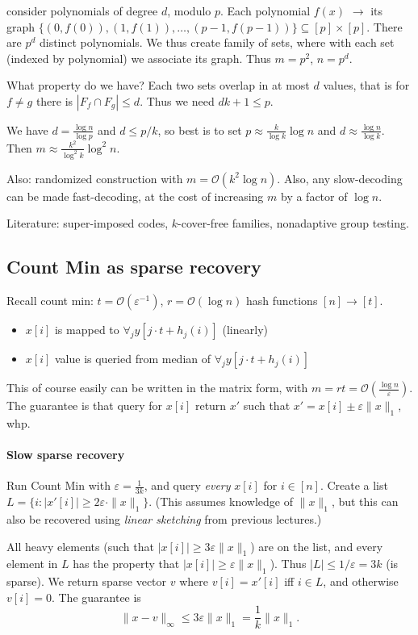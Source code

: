 \documentclass[11pt]{article}
\newcommand{\bigo}{\mathcal{O}}
\begin{document}
{consider polynomials of degree $d$, modulo $p$. Each polynomial $f(x)$ $\to$ its graph $\{(0,f(0)), (1,f(1)), \ldots, (p-1,f(p-1))\} \subseteq [p] \times [p]$. There are $p^d$ distinct polynomials. We thus create family of sets, where with each set (indexed by polynomial) we associate its graph. Thus $m = p^2$, $n = p^d$.

What property do we have? Each two sets overlap in at most $d$ values, that is for $f \not = g$ there is $|F_f \cap F_g| \le d$. Thus we need $dk + 1 \le p$.

We have $d = \frac{\log n}{\log p}$ and $d \le p/k$, so best is to set $p \approx \frac{k}{\log k} \log n$ and $d \approx \frac{\log n}{\log k}$. Then $m \approx \frac{k^2}{\log^2 k} \log^2 n$.


Also: randomized construction with $m =\bigo(k^2 \log n)$. Also, any slow-decoding can be made fast-decoding, at the cost of increasing $m$ by a factor of $\log n$.

Literature: super-imposed codes, $k$-cover-free families, nonadaptive group testing.
\subsection{Count Min as sparse recovery}
Recall count min: $t = \bigo(\varepsilon^{-1})$, $r = \bigo(\log n)$ hash functions $[n] \to [t]$.
\begin{itemize}
\item $x[i]$ is mapped to $\forall_j y[j \cdot t + h_j(i)]$ (linearly)
\item $x[i]$ value is queried from median of $\forall_j y[j \cdot t + h_j(i)]$
\end{itemize}
This of course easily can be written in the matrix form, with $m = rt = \bigo(\frac{\log n}{\varepsilon})$. 
The guarantee is that query for $x[i]$ return $x'$ such that $x' = x[i] \pm \varepsilon \|x\|_1$, whp.

\paragraph{Slow sparse recovery}
Run Count Min with $\varepsilon = \frac{1}{3k}$, and query \emph{every} $x[i]$ for $i \in [n]$. Create a list $L = \{ i : |x'[i]| \ge  2\varepsilon \cdot \|x\|_1 \}$. (This assumes knowledge of $\|x\|_1$, but this can also be recovered using \emph{linear sketching} from previous lectures.)

All heavy elements (such that $|x[i]| \ge 3 \varepsilon \|x\|_1$) are on the list, and every element in $L$ has the property that $|x[i]| \ge \varepsilon \|x\|_1$). Thus $|L| \le 1/\varepsilon = 3k$ (is sparse). We return sparse vector $v$ where $v[i] = x'[i]$ iff $i \in L$, and otherwise $v[i] = 0$. The guarantee is
$$ \|x-v\|_\infty \le 3\varepsilon \|x\|_1 = \frac{1}{k} \|x\|_1.$$


}
\end{document}
